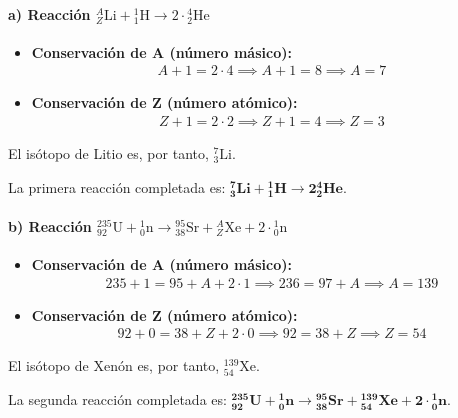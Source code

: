 \paragraph*{a) Reacción ${}_{Z}^{A}\text{Li} + {}_{1}^{1}\text{H} \rightarrow 2 \cdot {}_{2}^{4}\text{He}$}
\begin{itemize}
    \item \textbf{Conservación de A (número másico):}
    \begin{gather}
        A + 1 = 2 \cdot 4 \implies A + 1 = 8 \implies A = 7
    \end{gather}
    \item \textbf{Conservación de Z (número atómico):}
    \begin{gather}
        Z + 1 = 2 \cdot 2 \implies Z + 1 = 4 \implies Z = 3
    \end{gather}
\end{itemize}
El isótopo de Litio es, por tanto, ${}_{3}^{7}\text{Li}$.
\begin{cajaresultado}
    La primera reacción completada es: $\boldsymbol{{}_{3}^{7}\textbf{Li} + {}_{1}^{1}\textbf{H} \rightarrow 2{}_{2}^{4}\textbf{He}}$.
\end{cajaresultado}

\paragraph*{b) Reacción ${}_{92}^{235}\text{U} + {}_{0}^{1}\text{n} \rightarrow {}_{38}^{95}\text{Sr} + {}_{Z}^{A}\text{Xe} + 2 \cdot {}_{0}^{1}\text{n}$}
\begin{itemize}
    \item \textbf{Conservación de A (número másico):}
    \begin{gather}
        235 + 1 = 95 + A + 2 \cdot 1 \implies 236 = 97 + A \implies A = 139
    \end{gather}
    \item \textbf{Conservación de Z (número atómico):}
    \begin{gather}
        92 + 0 = 38 + Z + 2 \cdot 0 \implies 92 = 38 + Z \implies Z = 54
    \end{gather}
\end{itemize}
El isótopo de Xenón es, por tanto, ${}_{54}^{139}\text{Xe}$.
\begin{cajaresultado}
    La segunda reacción completada es: $\boldsymbol{{}_{92}^{235}\textbf{U} + {}_{0}^{1}\textbf{n} \rightarrow {}_{38}^{95}\textbf{Sr} + {}_{54}^{139}\textbf{Xe} + 2 \cdot {}_{0}^{1}\textbf{n}}$.
\end{cajaresultado}

